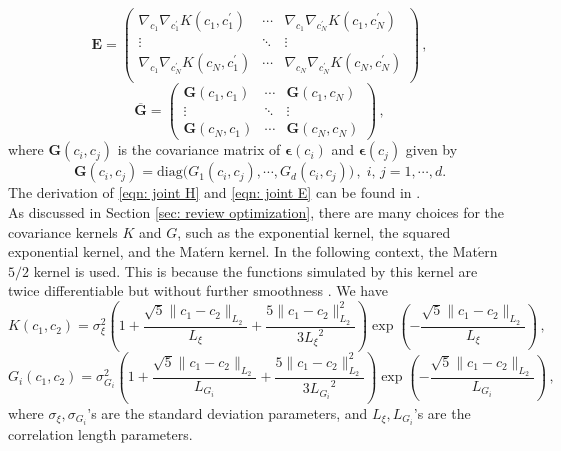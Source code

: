 \begin{equation}
    \boldsymbol{E} =
    \begin{pmatrix}
        \nabla_{c_1} \nabla_{c_1^\prime} K(c_1, c_1^\prime) & \cdots &
        \nabla_{c_1} \nabla_{c_N^\prime} K(c_1, c_N^\prime)\\
        \vdots & \ddots & \vdots \\
        \nabla_{c_1} \nabla_{c_N^\prime} K(c_N, c_1^\prime) & \cdots &
        \nabla_{c_N} \nabla_{c_N^\prime} K(c_N, c_N^\prime)\\
    \end{pmatrix}\,,
    \label{eqn: joint E}
\end{equation}
\begin{equation}
    \overline{\boldsymbol{G}} =
    \begin{pmatrix}
        \boldsymbol{G}(c_1, c_1) & \cdots & \boldsymbol{G}(c_1, c_N) \\
        \vdots & \ddots & \vdots \\
        \boldsymbol{G}(c_N, c_1) & \cdots & \boldsymbol{G}(c_N, c_N)
    \end{pmatrix}\,,
\end{equation}
where $\boldsymbol{G}(c_i, c_j)$ is the covariance matrix of $\boldsymbol{\epsilon}(c_i)$
and $\boldsymbol{\epsilon}(c_j)$ given by
\begin{equation}
    \boldsymbol{G}(c_i, c_j) = \textrm{diag}\big(G_1(c_i, c_j), \cdots, G_d(c_i, c_j)\big)\,,
    \; i, \, j=1,\cdots, d.
\end{equation}
The derivation of \eqref{eqn: joint H} and \eqref{eqn: joint E} can be found in \cite{grad coKriging}.\\

As discussed in Section \ref{sec: review optimization}, there are many choices for
the covariance kernels $K$ and $G$, such as the exponential kernel, the squared exponential kernel, and
the Mat$\acute{\textrm{e}}$rn kernel. In the following context, the
Mat$\acute{\textrm{e}}$rn $5/2$ kernel is used. This is because the functions simulated by this kernel
are twice differentiable but without further smoothness 
\cite{practical Bayesian, GP book, Matern kernel}. We have
\begin{equation}
       K(c_1,c_2) = \sigma_\xi^2
       \left(1+ \frac{\sqrt{5}\|c_1-c_2\|_{L_2}}{L_\xi}
       + \frac{5\|c_1-c_2\|_{L_2}^2}{ 3{L_\xi}^2}\right)
       \exp\left(-\frac{\sqrt{5}\|c_1-c_2\|_{L_2}}{{L_\xi}}\right) \,,
\end{equation}
\begin{equation}
       G_i(c_1,c_2) = \sigma_{G_i}^2
       \left(1+ \frac{\sqrt{5}\|c_1-c_2\|_{L_2}}{L_{G_i}}
       + \frac{5\|c_1-c_2\|_{L_2}^2}{ 3{L_{G_i}}^2}\right)
       \exp\left(-\frac{\sqrt{5}\|c_1-c_2\|_{L_2}}{{L_{G_i}}}\right) \,,
\end{equation}
where $\sigma_\xi, \sigma_{G_i}$'s are the standard deviation parameters, and
$L_{\xi}, L_{G_i}$'s are the correlation length parameters.\\

